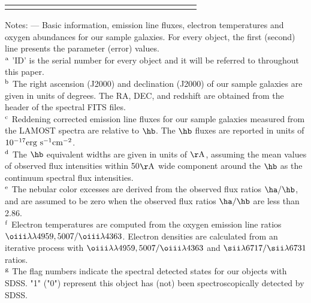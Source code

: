 \begin{center}
\begin{landscape}
\begin{longtable}{@{}lcccrrrccrrrrccrccrr@{}}
\hline
\label{table2}
\end{longtable}
\begin{flushleft}
{\sc Notes:} --- Basic information, emission line fluxes, electron temperatures and oxygen abundances 
for our sample galaxies. For every object, the first (second) line presents the parameter (error) values.\\
$\rm ^a$ 'ID' is the serial number for every object and it will be referred to throughout this paper. \\
$\rm ^b$  The right ascension (J2000) and declination (J2000) of our sample 
galaxies are given in units of degrees.
The RA, DEC, and redshift are obtained from the header of the spectral FITS 
files.\\ 
$\rm ^c$  Reddening corrected emission line fluxes for our sample galaxies measured from the LAMOST
spectra are relative to $\hb$. The $\hb$ fluxes are reported in units of $\rm 10^{-17}erg \ s^{-1}cm^{-2}$.\\
$\rm ^d$  The $\hb$ equivalent widths are given in units of $\rm \AA$, assuming the mean values of 
observed flux intensities within 50$\rm \AA$ wide component around the $\hb$ as the
continuum spectral flux intensities. \\
$\rm ^e$ The nebular color excesses are derived from the observed flux ratios $\ha/\hb$,
and are assumed to be zero when the observed flux ratios $\ha/\hb$ are less than 2.86. \\
$\rm ^f$ Electron temperatures are computed from the oxygen emission line ratios
$\oiii\lambda\lambda 4959,5007/\oiii\lambda4363$. Electron densities are calculated
from an iterative process with $\oiii\lambda\lambda 4959,5007/\oiii\lambda4363$ and
$\sii\lambda6717/\sii\lambda6731$ ratios. \\
$\rm ^g$ The flag numbers indicate the spectral detected states for our objects
with SDSS. "1" ("0") represent this object has (not) been spectroscopically 
detected by 
SDSS.

\end{flushleft}
\end{landscape}
\end{center}






 
